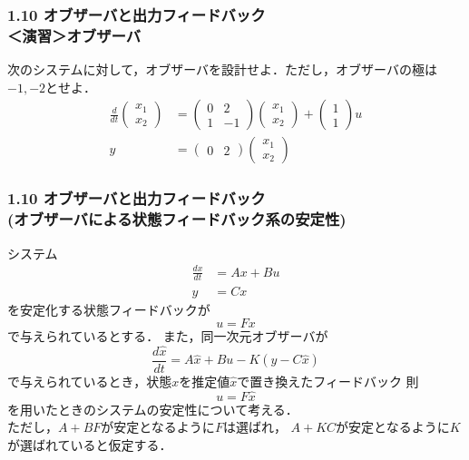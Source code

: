 \begin{frame}[t]
\frametitle{1.10 オブザーバと出力フィードバック\\ ＜演習＞オブザーバ}
次のシステムに対して，オブザーバを設計せよ．ただし，オブザーバの極は$-1,-2$とせよ．
\begin{align*}
	\frac{d}{dt}
	\left (
	\begin{array}{c}
	 x_1 \\ x_2 
	\end{array}
	\right )
	& = 
	\left (
	\begin{array}{cc}
	 0 & 2 \\
	 1 & -1
	\end{array}
	\right )
	\left (
	\begin{array}{c}
	 x_1 \\ x_2 
	\end{array}
	\right )
	+
	\left (
	\begin{array}{c}
	 1 \\ 1 
	\end{array}
	\right )
	u
\\
	y&=
	\left ( \begin{array}{cc}
		0 & 2 
	\end{array} \right )
	\left (	\begin{array}{c}
		x_1 \\ x_2 
	\end{array} \right )
\end{align*}
\end{frame}


\begin{frame}[t]
\frametitle{1.10 オブザーバと出力フィードバック \\
(オブザーバによる状態フィードバック系の安定性)}
システム
\begin{align}
 \frac{dx}{dt} &= A x + B u \\
 y             &= C x
\end{align}
を安定化する状態フィードバックが
\begin{equation}
 u = F x
\end{equation}
で与えられているとする．
また，同一次元オブザーバが
\begin{equation}
 \frac{d \hat{x}}{dt} = A \hat{x} + B u - K (y - C \hat{x})
  \label{eq:obs}
\end{equation}
で与えられているとき，状態$x$を推定値$\hat{x}$で置き換えたフィードバック
則
\begin{equation}
 u = F \hat{x}
\end{equation}
を用いたときのシステムの安定性について考える．\\
ただし，$A + BF$が安定となるように$F$は選ばれ，
$A + KC$が安定となるように$K$が選ばれていると仮定する．
\end{frame}


